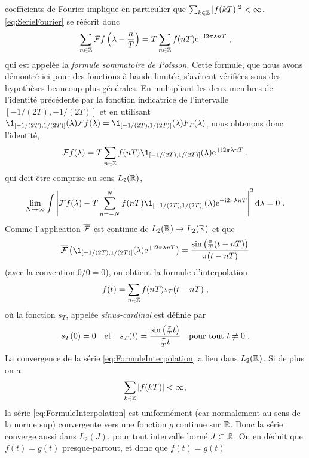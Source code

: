 coefficients de Fourier implique en particulier que $\sum_{k \in \mathbb{Z}} |f(kT)|^2 < \infty$. \eqref{eq:SerieFourier} se r{\'e}{\'e}crit donc
\begin{equation}
\label{eq:FormuleSommatoirePoisson}
\sum_{n \in \mathbb{Z}} \mathcal{F} f \left( \lambda - \frac{n}{T} \right)  = T \sum_{n \in \mathbb{Z}} f(nT) \mathrm{e}^{+ \mathrm{i} 2 \pi \lambda n T}\;,
\end{equation}
qui est appel{\'e}e la \emph{formule sommatoire de Poisson}. Cette formule, que nous avons d{\'e}montr{\'e} ici pour des fonctions {\`a} bande limit{\'e}e, s'av{\`e}rent v{\'e}rifi{\'e}es
sous des hypoth{\`e}ses beaucoup plus g{\'e}n{\'e}rales. En multipliant les deux membres de l'identit{\'e} pr{\'e}c{\'e}dente par la fonction indicatrice de l'intervalle
$[-1/(2T),+1/(2T)]$ et en utilisant $\1_{[-1/(2T),1/(2T)]}(\lambda) \TF f (\lambda)= \1_{[-1/(2T),1/(2T)]}(\lambda) F_T(\lambda)$,
nous obtenons donc l'identit{\'e},
$$
\TF f (\lambda) = T \sum_{n \in \zset} f(nT) \1_{[-1/(2T),1/(2T)]}(\lambda) \rme^{+ \rmi 2 \pi \lambda n T} \eqsp.
$$
qui doit {\^e}tre comprise au sens $L_2(\mathbb{R})$,
$$
\lim_{N \to \infty} \int \left| \TF f(\lambda)  - T \sum_{n =-N}^N f(nT) \1_{[-1/(2T),1/(2T)]}(\lambda) \rme^{+ \rmi 2 \pi
    \lambda n T}  \right|^2 \rmd \lambda = 0 \eqsp.
$$
Comme l'application $\overline{\mathcal{F}}$ est continue de $L_2(\mathbb{R}) \to L_2(\mathbb{R})$ et que
$$
\TFAC{\1_{[-1/(2T),1/(2T)]}(\lambda) \rme^{+ \rmi 2 \pi \lambda n T}}= \frac{\sin\left( \frac{\pi}{T}(t - nT)\right)}{\pi(t-nT)}
$$
(avec la convention $0/0=0$), on obtient la formule d'interpolation
\begin{equation}
\label{eq:FormuleInterpolation}
f(t) = \sum_{n \in \mathbb{Z}} f(nT) s_T(t-nT)  \;,
\end{equation}
o{\`u} la fonction $s_T$, appel{\'e}e \emph{sinus-cardinal} est d{\'e}finie par
\begin{equation}
\label{eq:SinusCardinal}
s_T(0)=0\quad\text{et}\quad s_T(t) = \frac{\sin \left( \frac{\pi}{T} t\right) }{ \frac{\pi}{T} t}\quad\text{pour tout $t\neq0$} \;.
\end{equation}
La convergence de la s{\'e}rie \eqref{eq:FormuleInterpolation} a lieu dans $L_2(\mathbb{R})$. Si de plus on a
$$
\sum_{k \in \mathbb{Z}} |f(kT)| < \infty,
$$
la s{\'e}rie \eqref{eq:FormuleInterpolation} est uniform{\'e}ment (car normalement au sens de la norme sup) convergente vers une
fonction $g$ continue sur $\mathbb{R}$. Donc la
s{\'e}rie converge aussi dans $L_2(J)$, pour tout intervalle born{\'e} $J \subset \mathbb{R}$. On en d{\'e}duit que $f(t)= g(t)$ presque-partout, et donc que $f(t)= g(t)$
